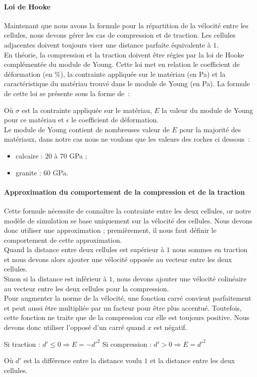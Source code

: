 \documentclass[a4paper,11pt]{article}
\begin{document}
\paragraph{Loi de Hooke}
\medbreak
Maintenant que nous avons la formule pour la répartition de la vélocité entre les cellules, nous devons gérer les cas de compression et de traction.
Les cellules adjacentes doivent toujours viser une distance parfaite équivalente à $1$. \\
En théorie, la compression et la traction doivent être régies par la loi de Hooke complémentée du module de Young. Cette loi met en relation le coefficient de déformation (en \%), la contrainte appliquée sur le matériau (en Pa) et la caractéristique du matériau trouvé dans le module de Young (en Pa).
La formule de cette loi se présente sous la forme de~:
\begin{center}
\end{center}
Où $\sigma$ est la contrainte appliquée sur le matériau, $E$ la valeur du module de Young pour ce matériau et $\epsilon$ le coefficient de déformation. \\
Le module de Young contient de nombreuses valeur de $E$ pour la majorité des matériaux, dans notre cas nous ne voulons que les valeurs des roches ci dessous~:
\begin{itemize}
  \item calcaire : 20 à 70 GPa ;
  \item granite : 60 GPa.
\end{itemize}

\paragraph{Approximation du comportement de la compression et de la traction}
\medbreak
Cette formule nécessite de connaître la contrainte entre les deux cellules, or notre modèle de simulation se base uniquement sur la vélocité des cellules.
Nous devons donc utiliser une approximation ; premièrement, il nous faut définir le comportement de cette approximation.\\
Quand la distance entre deux cellules est supérieur à $1$ nous sommes en traction et nous devons alors ajouter une vélocité opposée au vecteur entre les deux cellules.\\
Sinon si la distance est inférieur à $1$, nous devons ajouter une vélocité colinéaire au vecteur entre les deux cellules pour la compression.\\
Pour augmenter la norme de la vélocité, une fonction carré convient parfaitement et peut aussi être multipliée par un facteur pour être plus accentué. Toutefois, cette fonction ne traite que de la compression car elle est toujours positive.
Nous devons donc utiliser l'opposé d'un carré quand $x$ est négatif.
\medbreak
\begin{center}
  Si traction : $d' \leqslant 0 \Rightarrow E = -d'^2$ \medbreak
  Si compression : $d' > 0 \Rightarrow E = d'^2$
\end{center}
Où $d'$ est la différence entre la distance voulu $1$ et la distance entre les deux cellules. \\
\end{document}
